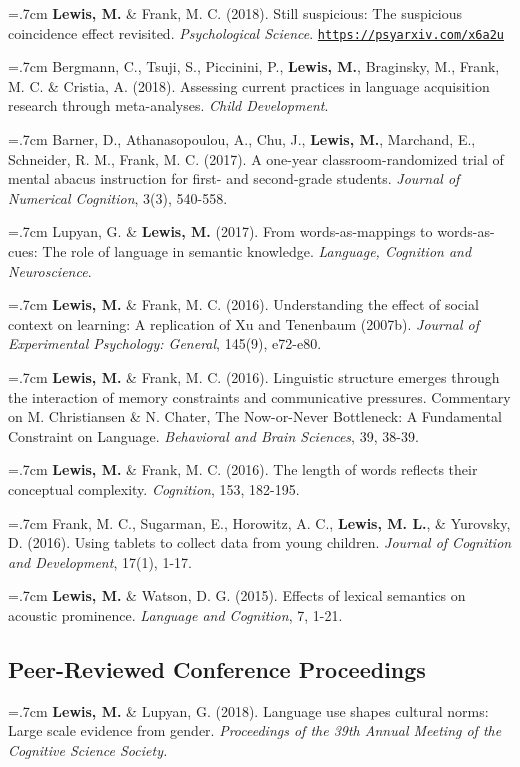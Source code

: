 \documentclass[letterpaper]{article}
\begin{document}
\hangindent=.7cm {\bf Lewis, M.} \& Frank, M. C. (2018). Still suspicious: The suspicious coincidence effect revisited.  {\it Psychological Science}. \href{https://psyarxiv.com/x6a2u}{\tt https://psyarxiv.com/x6a2u}


\hangindent=.7cm Bergmann, C., Tsuji, S., Piccinini, P., {\bf Lewis, M.}, Braginsky, M., Frank, M. C. \& Cristia, A. (2018). Assessing current practices in language acquisition research through meta-analyses. {\it Child Development}.

\hangindent=.7cm Barner, D., Athanasopoulou, A., Chu, J., {\bf Lewis, M.}, Marchand, E., Schneider, R. M., Frank, M. C. (2017). A one-year classroom-randomized trial of mental abacus instruction for first- and second-grade students.  {\it Journal of Numerical Cognition}, 3(3), 540-558.


\hangindent=.7cm Lupyan, G. \& {\bf Lewis, M.} (2017). From words-as-mappings to words-as-cues: The role of language in semantic knowledge. {\it Language, Cognition and Neuroscience}.

  \hangindent=.7cm {\bf Lewis, M.} \& Frank, M. C. (2016). Understanding the effect of social context on learning: A replication of Xu and Tenenbaum (2007b). {\it Journal of Experimental Psychology: General}, 145(9), e72-e80.

 \hangindent=.7cm {\bf Lewis, M.} \& Frank, M. C. (2016). Linguistic structure emerges through the interaction of memory constraints and communicative pressures. Commentary on M. Christiansen \& N. Chater, The Now-or-Never Bottleneck: A Fundamental Constraint on Language. {\it Behavioral and Brain Sciences}, 39, 38-39.

  \hangindent=.7cm {\bf Lewis, M.} \& Frank, M. C. (2016). The length of words reflects their conceptual complexity. {\it Cognition}, 153, 182-195.

 \hangindent=.7cm Frank, M. C., Sugarman, E., Horowitz, A. C., {\bf Lewis, M. L.}, \& Yurovsky, D. (2016). Using tablets to collect data from young children. {\it Journal of Cognition and Development}, 17(1), 1-17.

  \hangindent=.7cm {\bf Lewis, M.} \& Watson, D. G. (2015). Effects of lexical semantics on acoustic prominence. { \it Language and Cognition}, 7, 1-21.

  \subsection*{Peer-Reviewed Conference Proceedings}
    \hangindent=.7cm {\bf Lewis, M.} \& Lupyan, G. (2018). Language use shapes cultural norms: Large scale evidence from gender.  { \it Proceedings of the 39th Annual Meeting of the Cognitive Science Society.}
\end{document}

